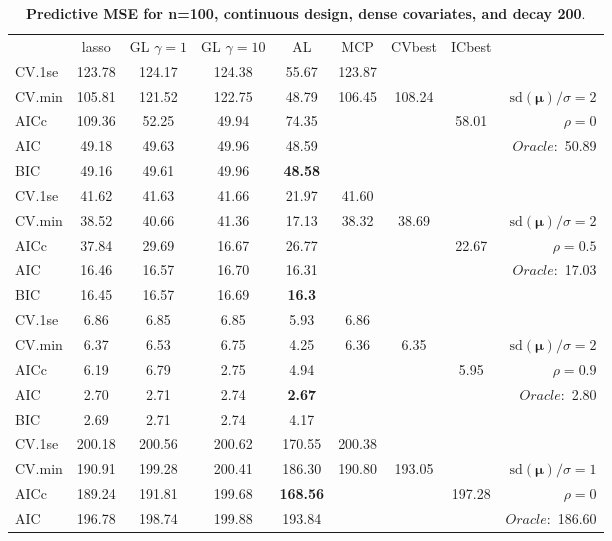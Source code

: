 \begin{table}\vspace{-.5cm}
\caption[l]{ { \bf Predictive MSE for n=100, continuous design, 
dense covariates, and  decay  200}.}
\vspace{-.5cm}
\footnotesize{}
\begin{center}
\begin{tabular}{l*{7}{c}|r}
 & lasso & GL $\gamma=1$ & GL $\gamma=10$ & AL & MCP  & CVbest & ICbest  \\
\cline{1-9}
CV.1se & 123.78 & 124.17 & 124.38 & 55.67 & 123.87 & & & \\
CV.min & 105.81 & 121.52 & 122.75 & 48.79 & 106.45 & 108.24 & & $\mathrm{sd}(\mathbf{\mu})/\sigma=2$ \\
AICc & 109.36 & 52.25 & 49.94 & 74.35 & & & 58.01 &  $\rho=0$ \\
AIC & 49.18 & 49.63 & 49.96 & 48.59 & & & &  \multirow{2}{*}{$Oracle: $ 50.89} \\
BIC & 49.16 & 49.61 & 49.96 & {\bf 48.58} & & & &  \\
 \hline 
CV.1se & 41.62 & 41.63 & 41.66 & 21.97 & 41.60 & & & \\
CV.min & 38.52 & 40.66 & 41.36 & 17.13 & 38.32 & 38.69 & & $\mathrm{sd}(\mathbf{\mu})/\sigma=2$ \\
AICc & 37.84 & 29.69 & 16.67 & 26.77 & & & 22.67 &  $\rho=0.5$ \\
AIC & 16.46 & 16.57 & 16.70 & 16.31 & & & &  \multirow{2}{*}{$Oracle: $ 17.03} \\
BIC & 16.45 & 16.57 & 16.69 & {\bf 16.3} & & & &  \\
 \hline 
CV.1se & 6.86 & 6.85 & 6.85 & 5.93 & 6.86 & & & \\
CV.min & 6.37 & 6.53 & 6.75 & 4.25 & 6.36 & 6.35 & & $\mathrm{sd}(\mathbf{\mu})/\sigma=2$ \\
AICc & 6.19 & 6.79 & 2.75 & 4.94 & & & 5.95 &  $\rho=0.9$ \\
AIC & 2.70 & 2.71 & 2.74 & {\bf 2.67} & & & &  \multirow{2}{*}{$Oracle: $ 2.80} \\
BIC & 2.69 & 2.71 & 2.74 & 4.17 & & & &  \\
 \hline 
CV.1se & 200.18 & 200.56 & 200.62 & 170.55 & 200.38 & & & \\
CV.min & 190.91 & 199.28 & 200.41 & 186.30 & 190.80 & 193.05 & & $\mathrm{sd}(\mathbf{\mu})/\sigma=1$ \\
AICc & 189.24 & 191.81 & 199.68 & {\bf 168.56} & & & 197.28 &  $\rho=0$ \\
AIC & 196.78 & 198.74 & 199.88 & 193.84 & & & &  \multirow{2}{*}{$Oracle: $ 186.60} \\

\end{tabular}
\end{center}
\end{table}
